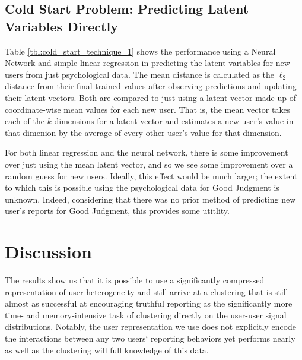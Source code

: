\documentclass{article}
\begin{document}
\subsection{Cold Start Problem: Predicting Latent Variables Directly} Table \ref{tbl:cold_start_technique_1} shows the performance using a Neural Network and simple linear regression in predicting the latent variables for new users from just psychological data. The mean distance is calculated as the $\ell_{2}$ distance from their final trained values after observing predictions and updating their latent vectors. Both are compared to just using a latent vector made up of coordinate-wise mean values for each new user. That is, the mean vector takes each of the $k$ dimensions for a latent vector and estimates a new user's value in that dimenion by the average of every other user's value for that dimension. 

For both linear regression and the neural network, there is some improvement over just using the mean latent vector, and so we see some improvement over a random guess for new users. Ideally, this effect would be much larger; the extent to which this is possible using the psychological data for Good Judgment is unknown. Indeed, considering that there was no prior method of predicting new user's reports for Good Judgment, this provides some utitlity.



\section{Discussion}





The results show us that it is possible to use a significantly compressed representation of user heterogeneity and still arrive at a clustering that is still almost as successful at encouraging truthful reporting as the significantly more time- and memory-intensive task of clustering directly on the user-user signal distributions. Notably, the user representation we use does not explicitly encode the interactions between any two users` reporting behaviors yet performs nearly as well as the clustering will full knowledge of this data.
\end{document}
